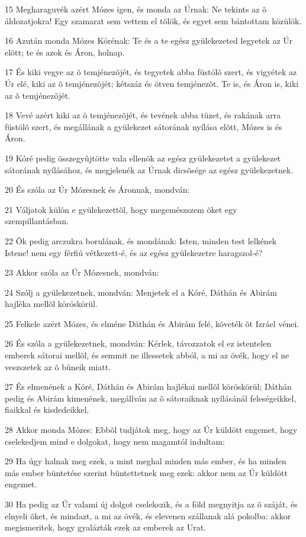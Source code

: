 \par 15 Megharaguvék azért Mózes igen, és monda az Úrnak: Ne tekints az õ áldozatjokra! Egy szamarat sem vettem el tõlök, és egyet sem bántottam közülök.
\par 16 Azután monda Mózes Kórénak: Te és a te egész gyülekezeted legyetek az Úr elõtt; te és azok és Áron, holnap.
\par 17 És kiki vegye az õ temjénezõjét, és tegyetek abba füstölõ szert, és vigyétek az Úr elé, kiki az õ temjénezõjét; kétszáz és ötven temjénezõt. Te is, és Áron is, kiki az õ temjénezõjét.
\par 18 Vevé azért kiki az õ temjénezõjét, és tevének abba tüzet, és rakának arra füstölõ szert, és megállának a gyülekezet sátorának nyílása elõtt, Mózes is és Áron.
\par 19 Kóré pedig összegyûjtötte vala ellenök az egész gyülekezetet a gyülekezet sátorának nyílásához, és megjelenék az Úrnak dicsõsége az egész gyülekezetnek.
\par 20 És szóla az Úr Mózesnek és Áronnak, mondván:
\par 21 Váljatok külön e gyülekezettõl, hogy megemészszem  õket egy szempillantásban.
\par 22 Õk pedig arczukra borulának, és mondának: Isten, minden test lelkének Istene! nem egy férfiú vétkezett-é, és az egész gyülekezetre haragszol-é?
\par 23 Akkor szóla az Úr Mózesnek, mondván:
\par 24 Szólj a gyülekezetnek, mondván: Menjetek el a Kóré, Dáthán és Abirám hajléka mellõl köröskörül.
\par 25 Felkele azért Mózes, és elméne Dáthán és Abirám felé, követék õt Izráel vénei.
\par 26 És szóla a gyülekezetnek, mondván: Kérlek, távozzatok el ez istentelen emberek sátorai mellõl, és semmit ne illessetek abból, a mi az övék, hogy el ne veszszetek az õ bûneik miatt.
\par 27 És elmenének a Kóré, Dáthán és Abirám hajlékai mellõl köröskörül; Dáthán pedig és Abirám kimenének, megállván az õ sátoraiknak nyílásánál feleségeikkel, fiaikkal és kisdedeikkel.
\par 28 Akkor monda Mózes: Ebbõl tudjátok meg, hogy az Úr küldött engemet, hogy cselekedjem mind e dolgokat, hogy nem magamtól indultam:
\par 29 Ha úgy halnak meg ezek, a mint meghal minden más ember, és ha minden más ember büntetése szerint büntettetnek meg ezek: akkor nem az Úr küldött engemet.
\par 30 Ha pedig az Úr valami új dolgot cselekszik, és a föld megnyitja az õ száját, és elnyeli õket, és mindazt, a mi az övék, és elevenen szállanak alá pokolba: akkor megismeritek, hogy gyalázták ezek az emberek az Urat.
